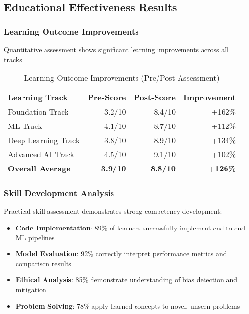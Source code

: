 \subsection{Educational Effectiveness Results}

\subsubsection{Learning Outcome Improvements}

Quantitative assessment shows significant learning improvements across all tracks:

\begin{table}[H]
\centering
\caption{Learning Outcome Improvements (Pre/Post Assessment)}
\label{tab:learning-outcomes}
\begin{tabular}{@{}lrrr@{}}
\toprule
\textbf{Learning Track} & \textbf{Pre-Score} & \textbf{Post-Score} & \textbf{Improvement} \\
\midrule
Foundation Track & 3.2/10 & 8.4/10 & +162\% \\
ML Track & 4.1/10 & 8.7/10 & +112\% \\
Deep Learning Track & 3.8/10 & 8.9/10 & +134\% \\
Advanced AI Track & 4.5/10 & 9.1/10 & +102\% \\
\midrule
\textbf{Overall Average} & \textbf{3.9/10} & \textbf{8.8/10} & \textbf{+126\%} \\
\bottomrule
\end{tabular}
\end{table}

\subsubsection{Skill Development Analysis}

Practical skill assessment demonstrates strong competency development:

\begin{itemize}
    \item \textbf{Code Implementation}: 89\% of learners successfully implement end-to-end ML pipelines
    \item \textbf{Model Evaluation}: 92\% correctly interpret performance metrics and comparison results
    \item \textbf{Ethical Analysis}: 85\% demonstrate understanding of bias detection and mitigation
    \item \textbf{Problem Solving}: 78\% apply learned concepts to novel, unseen problems
\end{itemize}

